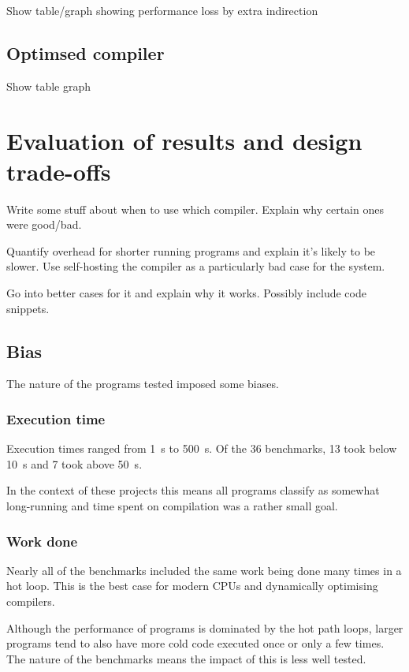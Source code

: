Show table/graph showing performance loss by extra indirection

\subsection{Optimsed compiler}

Show table graph

\section{Evaluation of results and design trade-offs}

Write some stuff about when to use which compiler. Explain why certain ones were good/bad.

Quantify overhead for shorter running programs and explain it's likely to be slower. Use
self-hosting the compiler as a particularly bad case for the system.

Go into better cases for it and explain why it works. Possibly include code snippets.

\subsection{Bias}

The nature of the programs tested imposed some biases.

\subsubsection{Execution time}

Execution times ranged from \SI{1}{\second} to \SI{500}{\second}. Of the 36 benchmarks, 13 took
below \SI{10}{\second} and 7 took above \SI{50}{\second}.

In the context of these projects this means all programs classify as somewhat long-running and time
spent on compilation was a rather small goal.

\subsubsection{Work done}

Nearly all of the benchmarks included the same work being done many times in a hot loop. This is
the best
case for modern CPUs and dynamically optimising compilers.

Although the performance of programs is dominated by the hot path loops, larger programs tend to
also
have more cold code executed once or only a few times. The nature of the benchmarks means the
impact
of this is less well tested.

